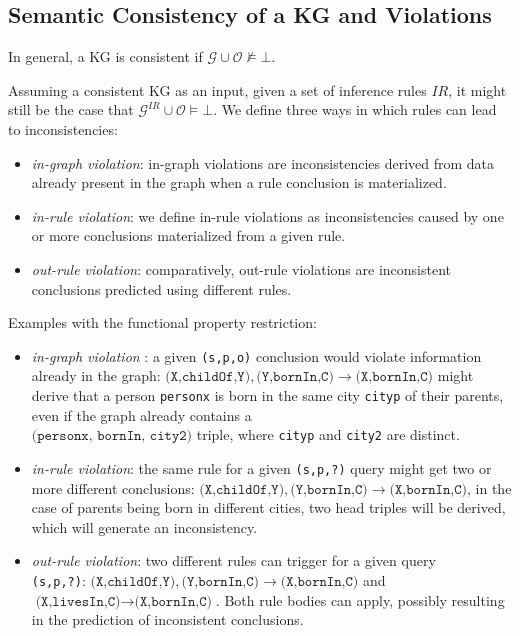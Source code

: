 \documentclass[a4paper,UKenglish,cleveref, autoref, thm-restate]{tgdk-v2021}
\begin{document}
\subsection{Semantic Consistency of a KG and Violations}

In general, a KG is consistent if $\mathcal{G} \cup \mathcal{O} \not\models \bot$. 

Assuming a consistent KG as an input, given a set of inference rules $IR$, it might still be the case that $\mathcal{G}^{IR} \cup \mathcal{O} \models \bot$. We define three ways in which rules can lead to inconsistencies:

\begin{itemize}
    \item \textit{in-graph violation}: in-graph violations are inconsistencies derived from data already present in the graph when a rule conclusion is materialized.
    \item \textit{in-rule violation}: we define in-rule violations as inconsistencies caused by one or more conclusions materialized from a given rule. 
    \item \textit{out-rule violation}: comparatively, out-rule violations are inconsistent conclusions predicted using different rules.
\end{itemize}

Examples with the functional property restriction:
\begin{itemize}
    \item \textit{in-graph violation} : a given \texttt{(s,p,o)} conclusion would violate information already in the graph: $\texttt{(X,childOf,Y)}, \texttt{(Y,bornIn,C)} \rightarrow \texttt{(X,bornIn,C)} $ might derive that a person \texttt{personx} is born in the same city \texttt{cityp} of their parents, even if the graph already contains a \\ $\texttt{(personx, bornIn, city2)}$ triple, where \texttt{cityp} and \texttt{city2} are distinct.
    \item \textit{in-rule violation}: the same rule for a given \texttt{(s,p,?)} query might get two or more different conclusions: $\texttt{(X,childOf,Y)}, \texttt{(Y,bornIn,C)} \rightarrow \texttt{(X,bornIn,C)} $, in the case of parents being born in different cities, two head triples will be derived, which will generate an inconsistency.
    \item \textit{out-rule violation}: two different rules can trigger for a given query\\ \texttt{(s,p,?)}: 
    $\texttt{(X,childOf,Y)}, \texttt{(Y,bornIn,C)} \rightarrow \texttt{(X,bornIn,C)} $ and\\ $\texttt{(X,livesIn,C)} \rightarrow \texttt{(X,bornIn,C)}$. Both rule bodies can apply, possibly resulting in the prediction of inconsistent conclusions.
\end{itemize} 
\end{document}
